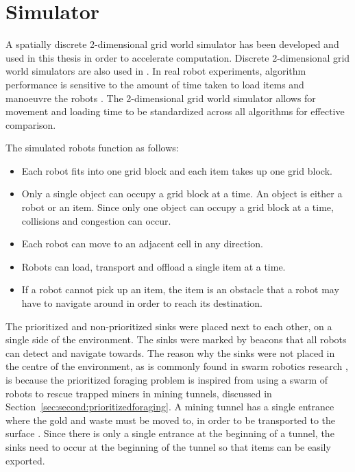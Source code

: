 \section{Simulator}
\label{simulator}
A spatially discrete 2-dimensional grid world simulator has been developed and used in this thesis in order to accelerate computation. Discrete 2-dimensional grid world simulators are also used in \cite{sugawara2002swarming, hecker2015beyond}. In real robot experiments, algorithm performance is sensitive to the amount of time taken to load items and manoeuvre the robots \cite{ostergaard2001emergent}. The 2-dimensional grid world simulator allows for movement and loading time to be standardized across all algorithms for effective comparison.

The simulated robots function as follows:
\begin{itemize}
	\item Each robot fits into one grid block and each item takes up one grid block. 
	\item Only a single object can occupy a grid block at a time.  An object is either a robot or an item. Since only one object can occupy a grid block at a time, collisions and congestion can occur.
	\item Each robot can move to an adjacent cell in any direction.
	\item Robots can load, transport and offload a single item at a time.
	\item If a robot cannot pick up an item, the item is an obstacle that a robot may have to navigate around in order to reach its destination.
\end{itemize}

The prioritized and non-prioritized sinks were placed next to each other, on a single side of the environment. The sinks were marked by beacons that all robots can detect and navigate towards. The reason why the sinks were not placed in the centre of the environment, as is commonly found in swarm robotics research \cite{labella2006division}, is because the prioritized foraging problem is inspired from using a swarm of robots to rescue trapped miners in mining tunnels, discussed in Section~\ref{sec:second:prioritizedforaging}. A mining tunnel has a single entrance where the gold and waste must be moved to, in order to be transported to the surface \cite{brune2010extracting}. Since there is only a single entrance at the beginning of a tunnel, the sinks need to occur at the beginning of the tunnel so that items can be easily exported.

